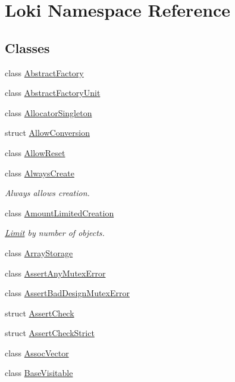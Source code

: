 \hypertarget{namespaceLoki}{}\section{Loki Namespace Reference}
\label{namespaceLoki}
\subsection*{Classes}
\begin{DoxyCompactItemize}
\item 
class \hyperlink{classLoki_1_1AbstractFactory}{Abstract\+Factory}
\item 
class \hyperlink{classLoki_1_1AbstractFactoryUnit}{Abstract\+Factory\+Unit}
\item 
class \hyperlink{classLoki_1_1AllocatorSingleton}{Allocator\+Singleton}
\item 
struct \hyperlink{structLoki_1_1AllowConversion}{Allow\+Conversion}
\item 
class \hyperlink{structLoki_1_1AllowReset}{Allow\+Reset}
\item 
class \hyperlink{classLoki_1_1AlwaysCreate}{Always\+Create}
\begin{DoxyCompactList}\small\item\em Always allows creation. \end{DoxyCompactList}\item 
class \hyperlink{classLoki_1_1AmountLimitedCreation}{Amount\+Limited\+Creation}
\begin{DoxyCompactList}\small\item\em \hyperlink{classLimit}{Limit} by number of objects. \end{DoxyCompactList}\item 
class \hyperlink{classLoki_1_1ArrayStorage}{Array\+Storage}
\item 
class \hyperlink{classLoki_1_1AssertAnyMutexError}{Assert\+Any\+Mutex\+Error}
\item 
class \hyperlink{classLoki_1_1AssertBadDesignMutexError}{Assert\+Bad\+Design\+Mutex\+Error}
\item 
struct \hyperlink{structLoki_1_1AssertCheck}{Assert\+Check}
\item 
struct \hyperlink{structLoki_1_1AssertCheckStrict}{Assert\+Check\+Strict}
\item 
class \hyperlink{classLoki_1_1AssocVector}{Assoc\+Vector}
\item 
class \hyperlink{classLoki_1_1BaseVisitable}{Base\+Visitable}
\item 

\end{DoxyCompactItemize}
